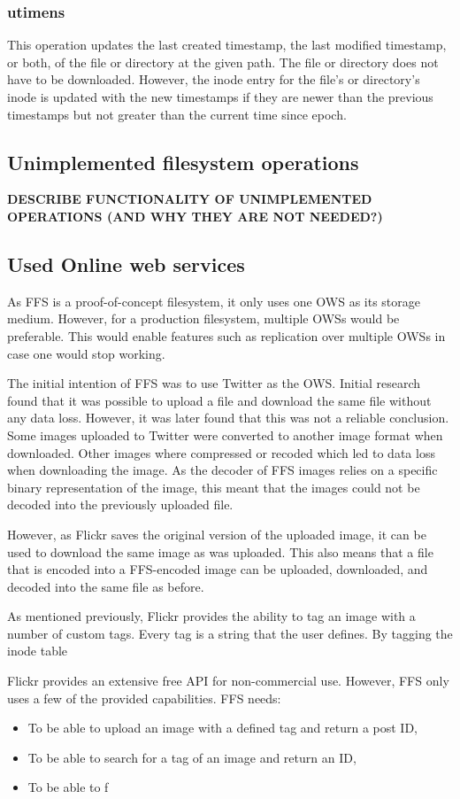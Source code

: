 \subsubsection{utimens}
This operation updates the last created timestamp, the last modified timestamp, or both, of the file or directory at the given path. The file or directory does not have to be downloaded. However, the inode entry for the file's or directory's inode is updated with the new timestamps if they are newer than the previous timestamps but not greater than the current time since epoch.

\subsection{Unimplemented filesystem operations}
\textbf{DESCRIBE FUNCTIONALITY OF UNIMPLEMENTED OPERATIONS (AND WHY THEY ARE NOT NEEDED?)}

\subsection{Used Online web services}
As FFS is a proof-of-concept filesystem, it only uses one OWS as its storage medium. However, for a production filesystem, multiple OWSs would be preferable. This would enable features such as replication over multiple OWSs in case one would stop working.

The initial intention of FFS was to use Twitter as the OWS. Initial research found that it was possible to upload a file and download the same file without any data loss. However, it was later found that this was not a reliable conclusion. Some images uploaded to Twitter were converted to another image format when downloaded. Other images where compressed or recoded which led to data loss when downloading the image. As the decoder of FFS images relies on a specific binary representation of the image, this meant that the images could not be decoded into the previously uploaded file. 

However, as Flickr saves the original version of the uploaded image, it can be used to download the same image as was uploaded. This also means that a file that is encoded into a FFS-encoded image can be uploaded, downloaded, and decoded into the same file as before. 

As mentioned previously, Flickr provides the ability to tag an image with a number of custom tags. Every tag is a string that the user defines. By tagging the inode table

Flickr provides an extensive free API for non-commercial use. However, FFS only uses a few of the provided capabilities. FFS needs:
\begin{itemize}
	\item To be able to upload an image with a defined tag and return a post ID,
	\item To be able to search for a tag of an image and return an ID,
	\item To be able to f
\end{itemize}